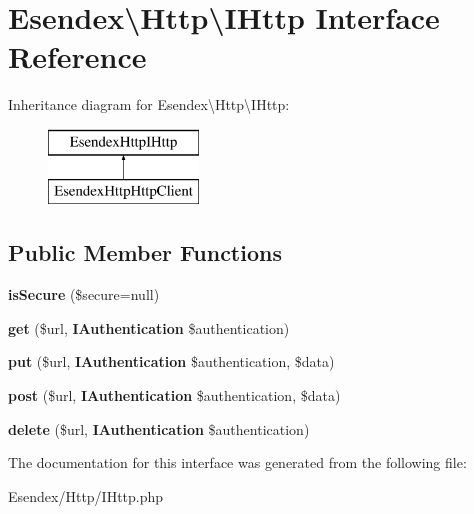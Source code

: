 \section{Esendex\textbackslash{}Http\textbackslash{}I\-Http Interface Reference}
\label{interface_esendex_1_1_http_1_1_i_http}
Inheritance diagram for Esendex\textbackslash{}Http\textbackslash{}I\-Http\-:\begin{figure}[H]
\begin{center}
\leavevmode
\includegraphics[height=2.000000cm]{interface_esendex_1_1_http_1_1_i_http}
\end{center}
\end{figure}
\subsection*{Public Member Functions}
\begin{DoxyCompactItemize}
\item 
{\bfseries is\-Secure} (\$secure=null)\label{interface_esendex_1_1_http_1_1_i_http_a8e84cc491ce194b457ac09e36dc0ac31}

\item 
{\bfseries get} (\$url, {\bf I\-Authentication} \$authentication)\label{interface_esendex_1_1_http_1_1_i_http_a2405aeac3e0efb67c6ac2c1be428c685}

\item 
{\bfseries put} (\$url, {\bf I\-Authentication} \$authentication, \$data)\label{interface_esendex_1_1_http_1_1_i_http_a79d584bd695e2122457aa846d89803b7}

\item 
{\bfseries post} (\$url, {\bf I\-Authentication} \$authentication, \$data)\label{interface_esendex_1_1_http_1_1_i_http_a5b09273e1009686250ee991a1e98af1f}

\item 
{\bfseries delete} (\$url, {\bf I\-Authentication} \$authentication)\label{interface_esendex_1_1_http_1_1_i_http_a94193293ce8de32558c84cc990f04e50}

\end{DoxyCompactItemize}


The documentation for this interface was generated from the following file\-:\begin{DoxyCompactItemize}
\item 
Esendex/\-Http/I\-Http.\-php\end{DoxyCompactItemize}
